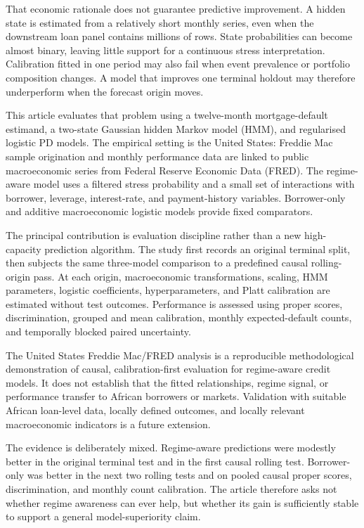 \documentclass[12pt]{article}
\begin{document}
That economic rationale does not guarantee predictive improvement. A hidden state is estimated from a relatively short monthly series, even when the downstream loan panel contains millions of rows. State probabilities can become almost binary, leaving little support for a continuous stress interpretation. Calibration fitted in one period may also fail when event prevalence or portfolio composition changes. A model that improves one terminal holdout may therefore underperform when the forecast origin moves.

This article evaluates that problem using a twelve-month mortgage-default estimand, a two-state Gaussian hidden Markov model (HMM), and regularised logistic PD models. The empirical setting is the United States: Freddie Mac sample origination and monthly performance data are linked to public macroeconomic series from Federal Reserve Economic Data (FRED). The regime-aware model uses a filtered stress probability and a small set of interactions with borrower, leverage, interest-rate, and payment-history variables. Borrower-only and additive macroeconomic logistic models provide fixed comparators.

The principal contribution is evaluation discipline rather than a new high-capacity prediction algorithm. The study first records an original terminal split, then subjects the same three-model comparison to a predefined causal rolling-origin pass. At each origin, macroeconomic transformations, scaling, HMM parameters, logistic coefficients, hyperparameters, and Platt calibration are estimated without test outcomes. Performance is assessed using proper scores, discrimination, grouped and mean calibration, monthly expected-default counts, and temporally blocked paired uncertainty.

The United States Freddie Mac/FRED analysis is a reproducible methodological demonstration of causal, calibration-first evaluation for regime-aware credit models. It does not establish that the fitted relationships, regime signal, or performance transfer to African borrowers or markets. Validation with suitable African loan-level data, locally defined outcomes, and locally relevant macroeconomic indicators is a future extension.

The evidence is deliberately mixed. Regime-aware predictions were modestly better in the original terminal test and in the first causal rolling test. Borrower-only was better in the next two rolling tests and on pooled causal proper scores, discrimination, and monthly count calibration. The article therefore asks not whether regime awareness can ever help, but whether its gain is sufficiently stable to support a general model-superiority claim.
\end{document}
